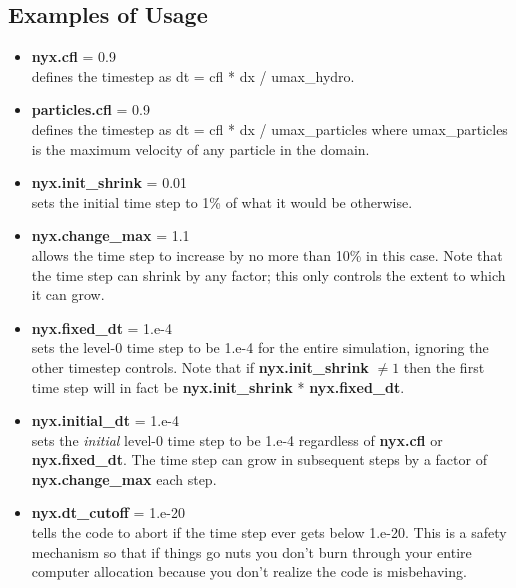\subsection{Examples of Usage}

\begin{itemize}

\item {\bf nyx.cfl} = 0.9 \\
defines the timestep as dt = cfl * dx / umax\_hydro.

\item {\bf particles.cfl} = 0.9 \\
defines the timestep as dt = cfl * dx / umax\_particles where umax\_particles is the maximum velocity 
of any particle in the domain.

\item {\bf nyx.init\_shrink} = 0.01 \\
sets the initial time step to 1\% of what it would be otherwise.  

\item {\bf nyx.change\_max} = 1.1\\
allows the time step to increase by no more than 10\% in this case.    Note that the time step
can shrink by any factor; this only controls the extent to which it can grow.

\item {\bf nyx.fixed\_dt} = 1.e-4\\
sets the level-0 time step to be 1.e-4 for the entire simulation, 
ignoring the other timestep controls.   Note that if {\bf nyx.init\_shrink} $\neq 1$
then the first time step will in fact be {\bf nyx.init\_shrink} * {\bf nyx.fixed\_dt}.

\item {\bf nyx.initial\_dt} = 1.e-4\\
sets the {\it initial} level-0 time step to be 1.e-4 regardless of 
{\bf nyx.cfl} or {\bf nyx.fixed\_dt}.  The time step can
grow in subsequent steps by a factor of {\bf nyx.change\_max} each step.

\item {\bf nyx.dt\_cutoff} = 1.e-20\\
tells the code to abort if the time step ever gets below 1.e-20. 
This is a safety mechanism so that if things go nuts you don't burn through your 
entire computer allocation because you don't realize the code is misbehaving.

\end{itemize}

